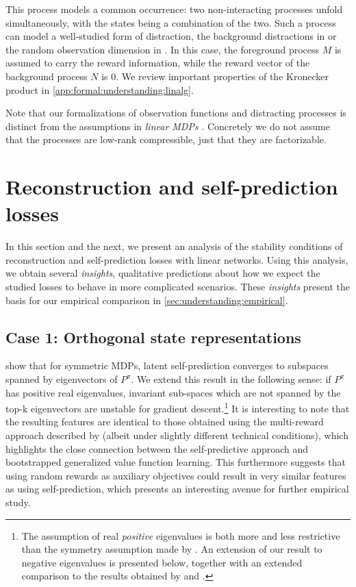 This process models a common occurrence: two non-interacting processes unfold simultaneously, with the states being a combination of the two.
Such a process can model a well-studied form of distraction, the background distractions in \cite{stone2021thedc} or the random observation dimension in \textcite{nikishin2021control,voelcker2022value}.
In this case, the foreground process $M$ is assumed to carry the reward information, while the reward vector of the background process $N$ is 0.
We review important properties of the Kronecker product in \autoref{app:formal:understanding:linalg}.


Note that our formalizations of observation functions and distracting processes is distinct from the assumptions in \emph{linear MDPs} \parencite{jin2020provably}. Concretely we do not assume that the processes are low-rank compressible, just that they are factorizable.

\section{Reconstruction and self-prediction losses}
\label{sec:understanding:stand_alone_tasks}

In this section and the next, we present an analysis of the stability conditions of reconstruction and self-prediction losses with linear networks.
Using this analysis, we obtain several \emph{insights}, qualitative predictions about how we expect the studied losses to behave in more complicated scenarios.
These \emph{insights} present the basis for our empirical comparison in \autoref{sec:understanding:empirical}.

\subsection{Case 1: Orthogonal state representations}


\cite{tang2022understanding} show that for symmetric MDPs, latent self-prediction converges to subspaces spanned by eigenvectors of $P^\pi$. 
We extend this result in the following sense: if $P^\pi$ has positive real eigenvalues, invariant sub-spaces which are not spanned by the top-k eigenvectors are unstable for gradient descent.\footnote{The assumption of real \emph{positive} eigenvalues is both more and less restrictive than the symmetry assumption made by \textcite{tang2022understanding}. An extension of our result to negative eigenvalues is presented below, together with an extended comparison to the results obtained by \textcite{tang2022understanding} and \textcite{lelan2023bootstrapped}.}
It is interesting to note that the resulting features are identical to those obtained using the multi-reward approach described by \cite{lelan2023bootstrapped} (albeit under slightly different technical conditions), which highlights the close connection between the self-predictive approach and bootstrapped generalized value function learning.
This furthermore suggests that using random rewards as auxiliary objectives \parencite{farebrother2023protovalue} could result in very similar features as using self-prediction, which presents an interesting avenue for further empirical study.

